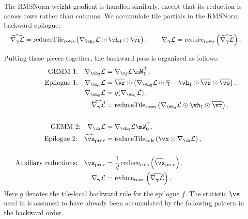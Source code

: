 The RMSNorm weight gradient is handled similarly, except that its reduction is across rows rather than columns. We accumulate tile partials in the RMSNorm backward epilogue:
\begin{align*}
\widehat{\nabla_{\boldsymbol{\gamma}}\mathcal{L}}
=
\operatorname{reduceTile}_{\mathrm{rows}}
\left(
\nabla_{\vh_2}\mathcal{L}
\odot \vh_1
\odot \overline{\vr}
\right),
\qquad
\nabla_{\boldsymbol{\gamma}}\mathcal{L}
=
\operatorname{reduce}_{\mathrm{rows}}
\left(
\widehat{\nabla_{\boldsymbol{\gamma}}\mathcal{L}}
\right).
\end{align*}

Putting these pieces together, the backward pass is organized as follows:
\begin{align*}
\text{GEMM 1:}\quad
\nabla_{\vh_2}\mathcal{L}
&=
\nabla_{\vy}\mathcal{L}\mW_1^\top, \\
\text{Epilogue 1:}\quad
\nabla_{\vh_1}\mathcal{L}
&=
\overline{\vr} \odot
\left(
\nabla_{\vh_2}\mathcal{L} \odot \overline{\boldsymbol{\gamma}}
-
\vh_1 \odot \overline{\vr} \odot \overline{\vs}
\right), \\
\nabla_{\vh_0}\mathcal{L}
&=
g(\nabla_{\vh_1}\mathcal{L}), \\
\widehat{\nabla_{\boldsymbol{\gamma}}\mathcal{L}}
&=
\operatorname{reduceTile}_{\mathrm{rows}}
\left(
\nabla_{\vh_2}\mathcal{L}
\odot \vh_1
\odot \overline{\vr}
\right), \\ \\
\text{GEMM 2:}\quad
\nabla_{\vx}\mathcal{L}
&=
\nabla_{\vh_0}\mathcal{L}\mW_0^\top, \\
\text{Epilogue 2:}\quad
\widehat{\vs}_{\mathrm{prev}}
&=
\operatorname{reduceTile}_{\mathrm{cols}}
\left(
\vx \odot \nabla_{\vx}\mathcal{L}
\right), \\ \\
\text{Auxiliary reductions:}\quad
\vs_{\mathrm{prev}}
&=
\frac{1}{d}
\operatorname{reduce}_{\mathrm{cols}}
\left(
\widehat{\vs}_{\mathrm{prev}}
\right), \\
\nabla_{\boldsymbol{\gamma}}\mathcal{L}
&=
\operatorname{reduce}_{\mathrm{rows}}
\left(
\widehat{\nabla_{\boldsymbol{\gamma}}\mathcal{L}}
\right).
\end{align*}
Here $g$ denotes the tile-local backward rule for the epilogue $f$. The statistic $\vs$ used in  is assumed to have already been accumulated by the following pattern in the backward order.

